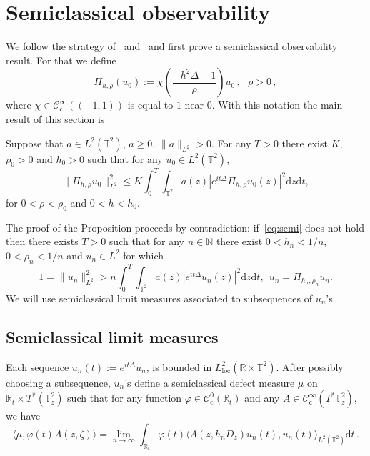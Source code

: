 \documentclass[10pt]{amsart}
\theoremstyle{definition}\newtheorem{defi}[theo]{Definition}\newtheorem{rema}[theo]{Remark}\newtheorem{exam}[theo]{Example}\newtheorem{exem}[theo]{Example}\newtheorem{nota}[theo]{Notation}
\newcommand{\CIc}{{\mathcal C}^\infty_{\mathrm{c}} }
\newcommand{\NN}{{\mathbb N}}
\newcommand{\R}{{\mathbb R}}
\newcommand{\TT}{{\mathbb T}}
\newcommand{\loc}{\mathrm{loc}}
\newcommand*{\dd}{\mathrm{d}}
\newcommand*{\dz}{\dd z}
\newcommand*{\dt}{\dd t}
\begin{document}
\section{Semiclassical observability}

We follow the strategy of~\cite{BZ4} and~\cite{BBZ} and first prove a semiclassical observability result. For that we define
\begin{equation}\label{eq:Pih}
\Pi_{h, \rho} (u_0) := \chi \left(\frac{ - h^2\Delta - 1} {\rho} \right) u_0\,, \ \ \ \rho > 0 \,,
\end{equation}
where $ \chi \in \CIc ((- 1, 1))$ is equal to $ 1 $ near $ 0 $. With this notation the main result of this section is
\begin{prop}\label{p:semi}
Suppose that $ a \in L^2 (\TT^2) $, $ a \geq 0 $, $ \| a \|_{L^2} > 0 $. For any $ T > 0 $ there exist $ K $, $ \rho_0 > 0 $ and $ h_0 > 0 $ such that for any $ u_0 \in L^2 (\TT^2) $,
\begin{equation}\label{eq:semi}
\| \Pi_{h, \rho} u_0 \|_{ L^2 }^2 \leq K \int_0^T \!\!\int_{ \TT^2} a (z) | e^{ i t \Delta} \Pi_{h, \rho} u_0 (z) |^2 \dz \dt,
\end{equation}
for $ 0 < \rho < \rho_0 $ and $ 0 < h < h_0 $.
\end{prop}

The proof of the Proposition proceeds by contradiction: if~\eqref{eq:semi} does not hold then there exists $ T > 0 $ such that for any $ n \in \NN $ there exist $ 0 < h_n < 1/n $, $ 0 < \rho_n < 1/n $ and $ u_n \in L^2 $ for which
\begin{equation}\label{eq:contr}
1 = \| u_n \|_{ L^2 }^2 > n \int_0^T \!\!\int_{ \TT^2} a (z) | e^{ i t \Delta} u_n (z) |^2 \dz \dt, \ \ u_n = \Pi_{ h_n, \rho_n } u_n.
\end{equation}
We will use semiclassical limit measures associated to subsequences of $ u_n$'s.

\subsection{Semiclassical limit measures}

Each sequence $ u_n (t) := e^{ i t \Delta } u_n $, is bounded in $L^2_{\loc} (\mathbb{R} \times \TT^2)$. After possibly choosing a subsequence, $ u_n $'s define a semiclassical defect measure $\mu $ on $\R_t \times T^* (\TT^2_z)$ such that for any function $\varphi \in {\mathcal C}^0_{\mathrm{c}} (\R_t)$ and any $A\in \CIc (T^*\TT^2_z)$, we have
\begin{equation}\label{eq:mu}
\langle \mu, \varphi(t) A(z, \zeta)\rangle = \lim_{n\rightarrow \infty} \int_{\R_t } \varphi(t)
\langle A(z, h_{n} D_z) u_{n} (t), u_n (t)
\rangle_{ L^2 (\TT^2) } \dt \,.
\end{equation}
\end{document}
